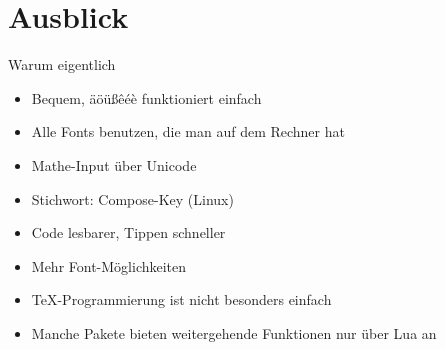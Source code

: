 \section{Ausblick}

\begin{frame}
  \centering
\end{frame}

\begin{frame}[fragile]{Warum eigentlich \LuaTeX}
  \linespread{1.5}
  \begin{description}
    \item[Unicode-Input]
      \begin{itemize}
        \item Bequem, äöüßêéè funktioniert einfach
      \end{itemize}
    \item[OTF-Fonts]
      \begin{itemize}
        \item Alle Fonts benutzen, die man auf dem Rechner hat
      \end{itemize}
    \item[Unicode-Math]
      \begin{itemize}
        \item Mathe-Input über Unicode
        \item Stichwort: Compose-Key (Linux)
        \item Code lesbarer, Tippen schneller
        \item Mehr Font-Möglichkeiten
      \end{itemize}
    \item[Lua-Programmierung]
      \begin{itemize}
        \item \TeX-Programmierung ist nicht besonders einfach
        \item Manche Pakete bieten weitergehende Funktionen nur über Lua an
      \end{itemize}
  \end{description}
\end{frame}

